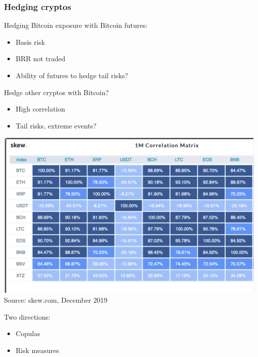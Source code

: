 \documentclass[10pt,mathserif,notes=show]{beamer}
\renewcommand{\(}{\begin{columns}}
\renewcommand{\)}{\end{columns}}
\newcommand{\<}[1]{\begin{column}{#1}}
\renewcommand{\>}{\end{column}}
\theoremstyle{definition}
\begin{document}
\begin{frame}
  \frametitle{Hedging cryptos}
  \begin{itemize}
  \item Hedging Bitcoin exposure with Bitcoin futures: 
    \begin{itemize}
    \item Basis risk
    \item BRR not traded
    \item Ability of futures to hedge tail risks?
    \end{itemize}
    \pause
    \begin{minipage}[t]{.525\linewidth}
    \item Hedge other cryptos with Bitcoin?
      \begin{itemize}
      \item High correlation
      \item Tail risks, extreme events?
      \end{itemize}
    \end{minipage}
    \begin{minipage}[t]{.45\linewidth}
      \begin{center}
        \includegraphics[scale=.125]{../_pics/SkewCorrelation.pdf}\\
        \hfill{\tiny Source: skew.com, December 2019}
      \end{center}
    \end{minipage}
    \vspace*{-4\baselineskip}
    \pause
    \item Two directions:
      \begin{itemize}
      \item Copulas
      \item Risk measures
      \end{itemize}
  \end{itemize}
\end{frame}
\end{document}
